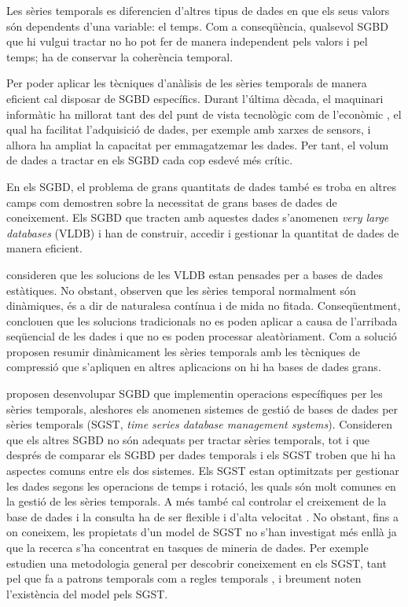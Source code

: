 Les sèries temporals es diferencien d'altres tipus de dades en que els seus valors són dependents d'una variable: el temps. Com a conseqüència, qualsevol SGBD que hi vulgui tractar no ho pot fer de manera independent pels valors i pel temps; ha de conservar la coherència temporal.

Per poder aplicar les tècniques d'anàlisis de les sèries temporals de manera eficient cal disposar de SGBD específics. 
Durant l'última dècada, el maquinari informàtic ha millorat tant des del punt de vista tecnològic com de l'econòmic \parencite{deligiannakis07}, el qual ha facilitat l'adquisició de dades, per exemple amb xarxes de sensors, i alhora ha ampliat la capacitat per emmagatzemar les dades. 
Per tant, el volum de dades a tractar  en els SGBD cada cop esdevé més crític.

 
En els SGBD, el problema de grans quantitats de dades també es troba en altres camps com demostren \textcite{mylopoulos96} sobre la necessitat de grans bases de dades de coneixement. Els SGBD que tracten amb aquestes dades s'anomenen \emph{very large databases} (VLDB) i han de construir, accedir i gestionar la quantitat de dades de manera eficient.

\textcite{ogras06}  consideren que les solucions de les VLDB estan pensades per a bases de dades estàtiques. No obstant, observen que les sèries temporal normalment són dinàmiques, és a dir de naturalesa contínua i de mida no fitada. Conseqüentment, conclouen que les solucions tradicionals no es poden aplicar a causa de l'arribada seqüencial de les dades i que no es poden processar aleatòriament. 
Com a solució proposen resumir dinàmicament les sèries temporals amb les tècniques de compressió que s'apliquen en altres aplicacions on hi ha bases de dades grans.




\textcite{dreyer94} proposen desenvolupar SGBD que implementin operacions específiques per les sèries temporals, aleshores els anomenen sistemes de gestió de bases de dades per sèries temporals (SGST, \emph{time series database management systems}). Consideren que els altres SGBD no són adequats per tractar sèries temporals, tot i que després de comparar els SGBD per dades temporals i els SGST \parencite{schmidt95} troben que hi ha aspectes comuns entre els dos sistemes.
Els SGST estan optimitzats per gestionar les dades segons les operacions de temps i rotació, les quals són molt comunes en la gestió de les sèries temporals.  A més també cal controlar el creixement de la base de dades i la consulta ha de ser flexible i d'alta velocitat \parencite{keogh10:isax}. 
No obstant, fins a on coneixem, les propietats d'un model de SGST no s'han investigat més enllà  ja que la recerca s'ha concentrat en tasques de mineria de dades. Per exemple \textcite{last01} estudien una metodologia general per descobrir coneixement en els SGST, tant pel que fa a 
patrons temporals %
com a regles temporals%
, i breument noten l'existència del model \cite{dreyer94} pels SGST.


